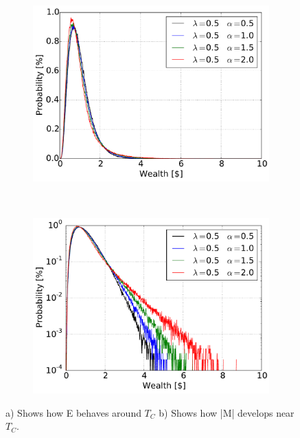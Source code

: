 \begin{figure}[H]
    \centering
    \begin{subfigure}{0.5\textwidth}
        \centering
        \includegraphics[width=\linewidth]{result/bilder/5d-50}
        \caption{}
    \end{subfigure}%
    ~ 
    \begin{subfigure}{0.5\textwidth}
        \centering
        \includegraphics[width=\linewidth]{result/bilder/5d-50-log}
        \caption{}
    \end{subfigure}
    \caption{a) Shows how E behaves around $T_C$ b) Shows how |M| develops near $T_C$.}
    \label{fig:5d-50}
\end{figure}




